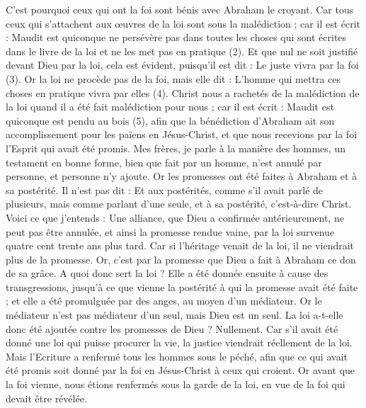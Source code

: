 \begin{multicols}{2}
C'est pourquoi ceux qui ont la foi sont bénis avec Abraham le croyant.
Car tous ceux qui s’attachent aux œuvres de la loi sont sous la malédiction ; car il est écrit : Maudit est quiconque ne persévère pas dans toutes les choses qui sont écrites dans le livre de la loi et ne les met pas en pratique (2).
Et que nul ne soit justifié devant Dieu par la loi, cela est évident, puisqu’il est dit : Le juste vivra par la foi (3).
Or la loi ne procède pas de la foi, mais elle dit : L'homme qui mettra ces choses en pratique vivra par elles (4).
Christ nous a rachetés de la malédiction de la loi quand il a été fait malédiction pour nous ; car il est écrit : Maudit est quiconque est pendu au bois (5),
afin que la bénédiction d'Abraham ait son accomplissement pour les païens en Jésus-Christ, et que nous recevions par la foi l'Esprit qui avait été promis.
Mes frères, je parle à la manière des hommes, un testament en bonne forme, bien que fait par un homme, n’est annulé par personne, et personne n’y ajoute.
Or les promesses ont été faites à Abraham et à sa postérité. Il n'est pas dit : Et aux postérités, comme s'il avait parlé de plusieurs, mais comme parlant d'une seule, et à sa postérité, c’est-à-dire Christ.
Voici ce que j’entends : Une alliance, que Dieu a confirmée antérieurement, ne peut pas être annulée, et ainsi la promesse rendue vaine, par la loi survenue quatre cent trente ans plus tard.
Car si l'héritage venait de la loi, il ne viendrait plus de la promesse. Or, c’est par la promesse que Dieu a fait à Abraham ce don de sa grâce.
A quoi donc sert la loi ? Elle a été donnée ensuite à cause des transgressions, jusqu'à ce que vienne la postérité à qui la promesse avait été faite ; et elle a été promulguée par des anges, au moyen d'un médiateur.
Or le médiateur n'est pas médiateur d'un seul, mais Dieu est un seul.
La loi a-t-elle donc été ajoutée contre les promesses de Dieu ? Nullement. Car s’il avait été donné une loi qui puisse procurer la vie, la justice viendrait réellement de la loi.
Mais l'Ecriture a renfermé tous les hommes sous le péché, afin que ce qui avait été promis soit donné par la foi en Jésus-Christ à ceux qui croient.
Or avant que la foi vienne, nous étions renfermés sous la garde de la loi, en vue de la foi qui devait être révélée.

\end{multicols}
